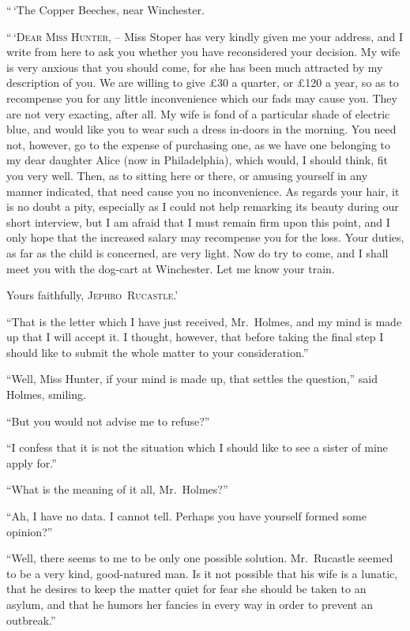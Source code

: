 “\,‘The Copper Beeches, near Winchester.

\begin{letter}
“\,‘\textsc{Dear Miss Hunter}, -- Miss Stoper has very kindly given
me your address, and I write from here to ask you whether
you have reconsidered your decision. My wife is very anxious
that you should come, for she has been much attracted by my
description of you. We are willing to give £30 a quarter, or
£120 a year, so as to recompense you for any little inconvenience
which our fads may cause you. They are not very
exacting, after all. My wife is fond of a particular shade of
electric blue, and would like you to wear such a dress in-doors
in the morning. You need not, however, go to the expense of
purchasing one, as we have one belonging to my dear daughter
Alice (now in Philadelphia), which would, I should think, fit
you very well. Then, as to sitting here or there, or amusing
yourself in any manner indicated, that need cause you no
inconvenience. As regards your hair, it is no doubt a pity,
especially as I could not help remarking its beauty during our
short interview, but I am afraid that I must remain firm upon
this point, and I only hope that the increased salary may
recompense you for the loss. Your duties, as far as the child
is concerned, are very light. Now do try to come, and I shall
meet you with the dog-cart at Winchester. Let me know your
train.

\hspace{1em}Yours faithfully, \hfill\textsc{Jephro~Rucastle}.’
\end{letter}

“That is the letter which I have just received, Mr.~Holmes,
and my mind is made up that I will accept it. I thought,
however, that before taking the final step I should like to
submit the whole matter to your consideration.”

“Well, Miss Hunter, if your mind is made up, that settles
the question,” said Holmes, smiling.

“But you would not advise me to refuse?”

“I confess that it is not the situation which I should like to
see a sister of mine apply for.”

“What is the meaning of it all, Mr.~Holmes?”

“Ah, I have no data. I cannot tell. Perhaps you have
yourself formed some opinion?”

“Well, there seems to me to be only one possible solution.
Mr.~Rucastle seemed to be a very kind, good-natured man. Is
it not possible that his wife is a lunatic, that he desires to
keep the matter quiet for fear she should be taken to an asylum,
and that he humors her fancies in every way in order to
prevent an outbreak.”

